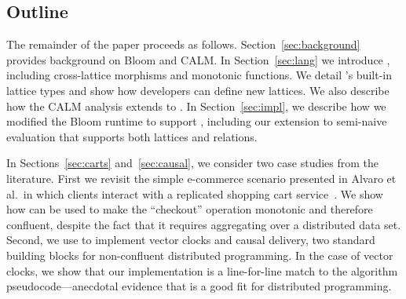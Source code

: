 % 

\subsection{Outline}
The remainder of the paper proceeds as follows.  Section~\ref{sec:background}
provides background on Bloom and CALM.  In Section~\ref{sec:lang} we introduce
\lang, including cross-lattice morphisms and monotonic functions. We detail
\lang's built-in lattice types and show how developers can define new lattices.
We also describe how the CALM analysis extends to \lang.  In
Section~\ref{sec:impl}, we describe how we modified the Bloom runtime to support
\lang, including our extension to semi-naive evaluation that supports both
lattices and relations.

In Sections~\ref{sec:carts} and~\ref{sec:causal}, we consider two case studies
from the literature.  First we revisit the simple e-commerce scenario presented
in Alvaro et al.\ in which clients interact with a replicated shopping cart
service~\cite{Alvaro2011}. We show how \lang can be used to make the
``checkout'' operation monotonic and therefore confluent, despite the fact that
it requires aggregating over a distributed data set.  Second, we use \lang to
implement vector clocks and causal delivery, two standard building blocks for
non-confluent distributed programming.  In the case of vector clocks, we show
that our implementation is a line-for-line match to the algorithm
pseudocode---anecdotal evidence that \lang is a good fit for distributed
programming.

